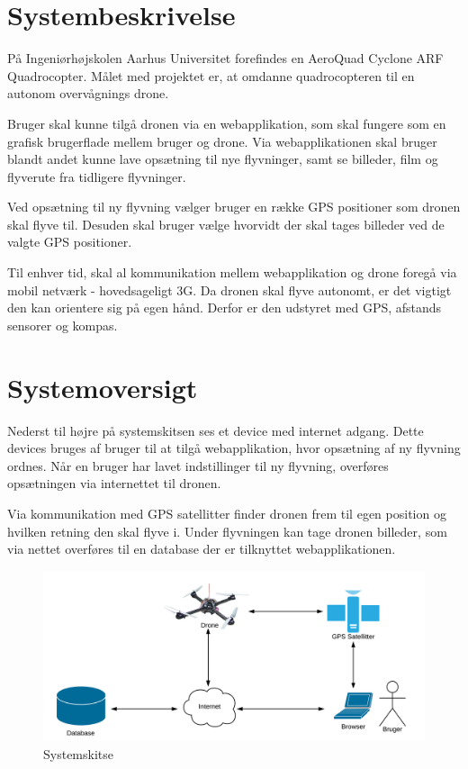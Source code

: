 \section{Systembeskrivelse}
På Ingeniørhøjskolen Aarhus Universitet forefindes en AeroQuad Cyclone ARF Quadrocopter. 
Målet med projektet er, at omdanne quadrocopteren til en autonom overvågnings drone.

Bruger skal kunne tilgå dronen via en webapplikation, som skal fungere som en grafisk brugerflade mellem bruger og drone. Via webapplikationen skal bruger blandt andet kunne lave opsætning til nye flyvninger, samt se billeder, film og flyverute fra tidligere flyvninger. 

Ved opsætning til ny flyvning vælger bruger en række GPS positioner som dronen skal flyve til. Desuden skal bruger vælge hvorvidt der skal tages billeder ved de valgte GPS positioner. 

Til enhver tid, skal al kommunikation mellem webapplikation og drone foregå via mobil netværk - hovedsageligt 3G. Da dronen skal flyve autonomt, er det vigtigt den kan orientere sig på egen hånd. Derfor er den udstyret med GPS, afstands sensorer og kompas.


\section{Systemoversigt}
Nederst til højre på systemskitsen ses et device med internet adgang. Dette devices bruges af bruger til at tilgå webapplikation, hvor opsætning af ny flyvning ordnes. Når en bruger har lavet indstillinger til ny flyvning, overføres opsætningen via internettet til dronen.
 
Via kommunikation med GPS satellitter finder dronen frem til egen position og hvilken retning den skal flyve i. Under flyvningen kan tage dronen billeder, som via nettet overføres til en database der er tilknyttet webapplikationen.

\vspace{-5pt}
\begin{figure}[H]
\centering
\includegraphics[width=1\textwidth]{Billeder/Projektbeskrivelse.png}
\vspace{-5pt}
\caption{Systemskitse}
\label{fig:Systemskitse}
\end{figure}